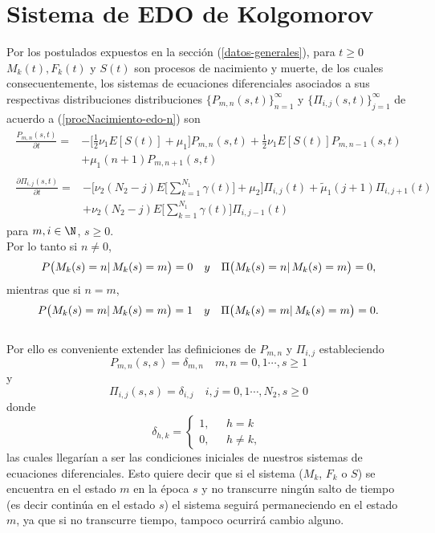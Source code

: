 \section{Sistema de EDO de Kolgomorov}
Por los postulados expuestos en la sección (\ref{datos-generales}), para $t\geq 0$  $M_k(t), F_k(t)$ y $S(t)$ son procesos de nacimiento y muerte, de los cuales consecuentemente, los sistemas de ecuaciones diferenciales asociados a sus respectivas distribuciones distribuciones $\{P_{m,n}(s,t)\}_{n=1}^\infty$ y $\{\Pi_{i,j}(s,t)\}_{j=1}^\infty$ de acuerdo a (\ref{procNacimiento-edo-n}) son
\begin{eqnarray}
    \begin{array}{cr}
        \frac{P_{m,n}(s,t)}{\partial t} = & -\bigg[\frac{1}{2}\nu_1E[S(t)]+\mu_1\bigg]P_{m,n}(s,t)+\frac{1}{2}\nu_1E[S(t)]P_{m,n-1}(s,t) \\
        & +\mu_1 (n+1)P_{m,n+1}(s,t)
    \end{array}
    \label{tesis-edo-p_n}
\end{eqnarray}
\begin{eqnarray}
    \begin{array}{cr}
     \frac{\partial\Pi_{i,j}(s,t)}{\partial t}= & -\bigg[\nu_2(N_2-j)E\big[\sum_{k=1}^{N_1}\gamma(t)\big]+\mu_2\bigg]\Pi_{i,j}(t)
     +\tilde{\mu}_1 (j+1)\Pi_{i,j+1}(t)
     \\&+\nu_2(N_2-j)E\big[\sum_{k=1}^{N_1}\gamma(t)\big]\Pi_{i,j-1}(t)
    \end{array}
\end{eqnarray}
para $m,i\in\N$, $s\geq 0$.\\
Por lo tanto si $n\not=0$, $$P\big(M_k(s)=n |\thinspace M_k(s)=m\big)=0\quad y\quad \Pi\big(M_k(s)=n |\thinspace M_k(s)=m\big)=0,$$
mientras que si $n=m$, $$P\big(M_k(s)=m |\thinspace M_k(s)=m\big)=1\quad y \quad \Pi\big(M_k(s)=m |\thinspace M_k(s)=m\big)=0.$$\\
Por ello es conveniente extender las definiciones de $P_{m,n}$ y $\Pi_{i,j}$ estableciendo $$P_{m,n}(s,s)=\delta_{m,n}\quad m,n=0,1\cdots, s\geq 1$$
y
$$\Pi_{i,j}(s,s)=\delta_{i,j}\quad i,j=0,1\cdots,N_2, s\geq 0$$
donde 
$$\delta_{h,k}=
    \begin{cases}
    1, & \mbox{ $h=k$ } \\
    0, & \mbox{ $h\not=k$},
    \end{cases}$$
las cuales llegarían a ser las condiciones iniciales de nuestros sistemas de ecuaciones diferenciales.
Esto quiere decir que si el sistema ($M_k$, $F_k$ o $S$) se encuentra en el estado $m$ en la época $s$ y no transcurre ningún salto de tiempo (es decir continúa en el estado $s$) el sistema seguirá permaneciendo en el estado $m$, ya que si no transcurre tiempo, tampoco ocurrirá cambio alguno.\\
